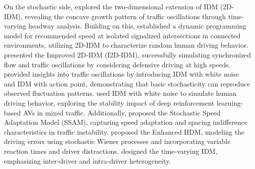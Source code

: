 \documentclass[a4paper,fleqn]{cas-sc}
\begin{document}
On the stochastic side, \cite{jiangTrafficExperimentRevealsNature2014a} explored the two-dimensional extension of IDM (2D-IDM), revealing the concave growth pattern of traffic oscillations through time-varying headway analysis. Building on this, \cite{xiong_speed_2022} established a dynamic programming model for recommended speed at isolated signalized intersections in connected environments, utilizing 2D-IDM to characterize random human driving behavior. \cite{tianImproved2DIntelligentDriver2016} presented the Improved 2D-IDM (I2D-IDM), successfully simulating synchronized flow and traffic oscillations by considering defensive driving at high speeds. \cite{treiberIntelligentDriverModelStochasticity2018} provided insights into traffic oscillations by introducing IDM with white noise and IDM with action point, demonstrating that basic stochasticity can reproduce observed fluctuation patterns. \cite{leeStabilityAnalysisMixedAutonomousTraffic2023a} used IDM with white noise to simulate human driving behavior, exploring the stability impact of deep reinforcement learning-based AVs in mixed traffic. Additionally, \cite{tianRoleSpeedAdaptationSpacing2019} proposed the Stochastic Speed Adaptation Model (SSAM), capturing speed adaptation and spacing indifference characteristics in traffic instability. \cite{lindorfer_modeling_2018} proposed the Enhanced HDM, modeling the driving errors using stochastic Wiener processes and incorporating variable reaction times and driver distractions. \cite{zhangGenerativeCarFollowingModelConditioned2022c} designed the time-varying IDM, emphasizing inter-driver and intra-driver heterogeneity. 
\end{document}
